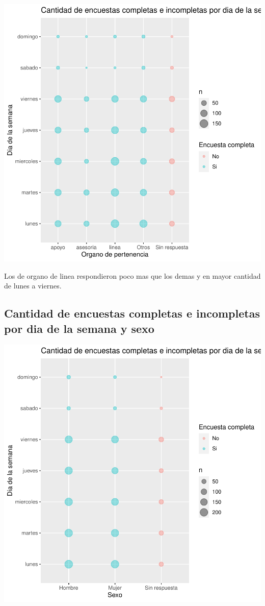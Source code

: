 \documentclass{article}
\begin{document}
\includegraphics{seguimientov3-021}

Los de organo de linea respondieron poco mas que los demas y en mayor cantidad de lunes a viernes.

\subsection{Cantidad de encuestas completas e incompletas por dia de la semana y sexo}

\includegraphics{seguimientov3-022}
\end{document}
